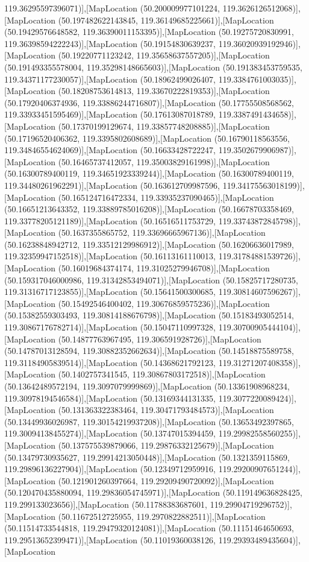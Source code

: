 119.36295597396071)],[MapLocation (50.200009977101224, 119.3626126512068)],[MapLocation (50.197482622143845, 119.36149685225661)],[MapLocation (50.19429576648582, 119.36390011153395)],[MapLocation (50.19275720830991, 119.36398594222243)],[MapLocation (50.19154830639237, 119.36020939192946)],[MapLocation (50.19220771123242, 119.35658637557205)],[MapLocation (50.191493355578004, 119.35298148665603)],[MapLocation (50.191383453759535, 119.34371177230057)],[MapLocation (50.18962499026407, 119.3384761003035)],[MapLocation (50.18208753614813, 119.33670222819353)],[MapLocation (50.17920406374936, 119.33886244716807)],[MapLocation (50.17755508568562, 119.33933451595469)],[MapLocation (50.17613087018789, 119.3387491434658)],[MapLocation (50.17370199129674, 119.33857748208885)],[MapLocation (50.17196520406362, 119.3395802608689)],[MapLocation (50.16790118563556, 119.34846554624069)],[MapLocation (50.16633428722247, 119.3502679906987)],[MapLocation (50.16465737412057, 119.35003829161998)],[MapLocation (50.16300789400119, 119.34651923339244)],[MapLocation (50.16300789400119, 119.34480261962291)],[MapLocation (50.163612709987596, 119.34175563018199)],[MapLocation (50.165124716472334, 119.33935237090465)],[MapLocation (50.16651213643352, 119.33889785016208)],[MapLocation (50.16678703358469, 119.33778205121189)],[MapLocation (50.16516511753729, 119.33743872845798)],[MapLocation (50.1637355865752, 119.33696665967136)],[MapLocation (50.16238848942712, 119.33512129986912)],[MapLocation (50.16206636017989, 119.32359947152518)],[MapLocation (50.16113161110013, 119.31784881539726)],[MapLocation (50.16019684374174, 119.31025279946708)],[MapLocation (50.159317046000986, 119.31342853494071)],[MapLocation (50.15825717280735, 119.31316717123855)],[MapLocation (50.15641500300685, 119.30814607596267)],[MapLocation (50.15492546400402, 119.30676859575236)],[MapLocation (50.15382559303493, 119.30814188676798)],[MapLocation (50.15183493052514, 119.30867176782714)],[MapLocation (50.15047110997328, 119.30700905444104)],[MapLocation (50.14877763967495, 119.306591928726)],[MapLocation (50.14787013128594, 119.30882352662634)],[MapLocation (50.14518875589758, 119.31184905839514)],[MapLocation (50.14368621792123, 119.31271207408358)],[MapLocation (50.1402757341545, 119.30867803172518)],[MapLocation (50.13642489572194, 119.3097079999869)],[MapLocation (50.13361908968234, 119.30978194546584)],[MapLocation (50.13169344131335, 119.3077220089424)],[MapLocation (50.131363322383464, 119.30471793484573)],[MapLocation (50.13449936026987, 119.30154219937208)],[MapLocation (50.13653492397865, 119.30094138455274)],[MapLocation (50.13747015394459, 119.29982558560255)],[MapLocation (50.137575539879066, 119.29876332125679)],[MapLocation (50.13479730935627, 119.29914213050448)],[MapLocation (50.1321359115869, 119.29896136227904)],[MapLocation (50.12349712959916, 119.29200907651244)],[MapLocation (50.121901260397664, 119.29209490720092)],[MapLocation (50.120470435880094, 119.29836054745971)],[MapLocation (50.119149636828425, 119.299133023656)],[MapLocation (50.11788383687601, 119.29904719296752)],[MapLocation (50.11672512725955, 119.2970822882511)],[MapLocation (50.11514733544818, 119.29479320124081)],[MapLocation (50.11151464650693, 119.29513652399471)],[MapLocation (50.11019360038126, 119.29393489435604)],[MapLocation 